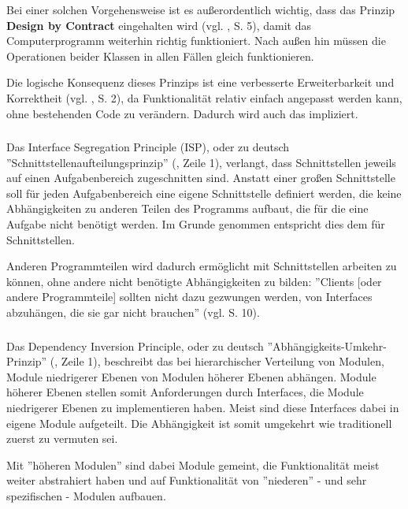 Bei einer solchen Vorgehensweise ist es außerordentlich wichtig, dass das Prinzip \textbf{Design by Contract} eingehalten wird (vgl. \cite{goll2014architektur}, S. 5), damit das Computerprogramm weiterhin richtig funktioniert. Nach außen hin müssen die Operationen beider Klassen in allen Fällen gleich funktionieren.

Die logische Konsequenz dieses Prinzips ist eine verbesserte Erweiterbarkeit und Korrektheit (vgl. \cite{itDesignersSOLID}, S. 2), da Funktionalität relativ einfach angepasst werden kann, ohne bestehenden Code zu verändern. 
Dadurch wird auch das  impliziert.


\subsubsection{\textPrincipleInterfaceSegregation}
\label{\textPrincipleInterfaceSegregation}
Das Interface Segregation Principle (ISP), oder zu deutsch ''Schnittstellenaufteilungsprinzip'' (\cite{wiki:isp}, Zeile 1), verlangt, dass Schnittstellen jeweils auf einen Aufgabenbereich zugeschnitten sind.
Anstatt einer großen Schnittstelle soll für jeden Aufgabenbereich eine eigene
Schnittstelle definiert werden, die keine Abhängigkeiten zu anderen Teilen des Programms 
aufbaut, die für die eine Aufgabe nicht benötigt werden.
Im Grunde genommen entspricht dies dem   für Schnittstellen.

Anderen Programmteilen wird dadurch ermöglicht mit Schnittstellen arbeiten zu können, ohne andere nicht benötigte Abhängigkeiten zu bilden: ''Clients [oder andere Programmteile] sollten nicht dazu gezwungen werden, von Interfaces abzuhängen, die sie gar nicht brauchen'' (vgl. \cite{goll2014architektur} S. 10).


\subsubsection{\textPrincipleDependencyInversion}
\label{\textPrincipleDependencyInversion}
Das Dependency Inversion Principle, oder zu deutsch ''Abhängigkeits-Umkehr-Prinzip'' (\cite{wiki:dip}, Zeile 1),
beschreibt das bei hierarchischer Verteilung von Modulen, Module niedrigerer Ebenen von Modulen höherer Ebenen abhängen.
Module höherer Ebenen stellen somit Anforderungen durch Interfaces, die Module niedrigerer Ebenen zu implementieren haben.
Meist sind diese Interfaces dabei in eigene Module aufgeteilt. Die Abhängigkeit ist somit umgekehrt wie traditionell
zuerst zu vermuten sei.

Mit ''höheren Modulen'' sind dabei Module gemeint, die Funktionalität meist weiter abstrahiert haben und auf 
Funktionalität von ''niederen'' - und sehr spezifischen - Modulen aufbauen.
